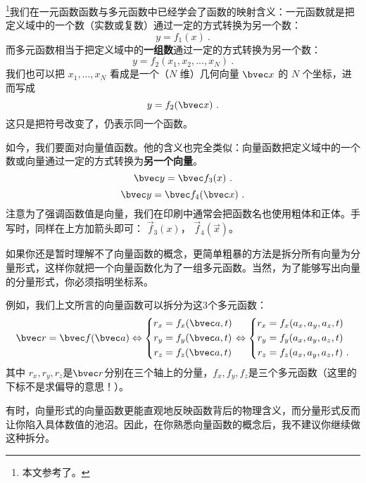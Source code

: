
\begin{issues}
\end{issues}


\footnote{本文参考了\cite{Thomas}。}我们在一元函数函数与多元函数中已经学会了函数的映射含义：一元函数就是把定义域中的一个数（实数或复数）通过一定的方式转换为另一个数：
\begin{equation}
y=f_1(x)~.
\end{equation}
而多元函数相当于把定义域中的\textbf{一组数}通过一定的方式转换为另一个数：
\begin{equation}
y=f_2(x_1, x_2,...,x_N)~.
\end{equation}
我们也可以把 $x_1,\dots,x_N$ 看成是一个（$N$ 维）几何向量 $\bvec x$ 的 $N$ 个坐标，进而写成
\begin{equation}
y=f_2(\bvec x)~.
\end{equation}
这只是把符号改变了，仍表示同一个函数。

如今，我们要面对向量值函数。他的含义也完全类似：向量函数把定义域中的一个数或向量通过一定的方式转换为\textbf{另一个向量}。
\begin{equation}
\bvec y = \bvec f_3 (x)~.
\end{equation}
\begin{equation}
\bvec y = \bvec f_4(\bvec x)~.
\end{equation}
注意为了强调函数值是向量，我们在印刷中通常会把函数名也使用粗体和正体。手写时，同样在上方加箭头即可： $\vec f_3(x)$， $\vec f_4(\vec x)$。

如果你还是暂时理解不了向量函数的概念，更简单粗暴的方法是拆分所有向量为分量形式，这样你就把一个向量函数化为了一组多元函数。当然，为了能够写出向量的分量形式，你必须指明坐标系。

例如，我们上文所言的向量函数可以拆分为这$3$个多元函数：
$$
\bvec r = \bvec f (\bvec a)
\Leftrightarrow
\left \{
\begin{aligned}
r_x &= f_x(\bvec a, t)\\
r_y &= f_y(\bvec a, t)\\
r_z &= f_z(\bvec a, t)\\
\end{aligned}
\right.
\Leftrightarrow
\left \{
\begin{aligned}
r_x &= f_x(a_x,a_y,a_z,t)\\
r_y &= f_y(a_x,a_y,a_z,t)\\
r_z &= f_z(a_x,a_y,a_z,t)~.\\
\end{aligned}
\right.
$$
其中 $r_x, r_y, r_z$是$\bvec r$分别在三个轴上的分量，$f_x,f_y,f_z$是三个多元函数（这里的下标不是求偏导的意思！）。

有时，向量形式的向量函数更能直观地反映函数背后的物理含义，而分量形式反而让你陷入具体数值的池沼。因此，在你熟悉向量函数的概念后，我不建议你继续做这种拆分。
